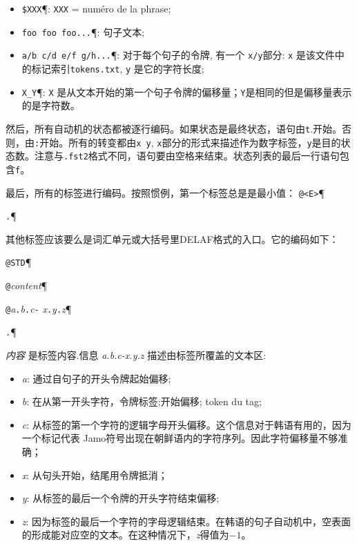 \begin{itemize}
\item \verb+$XXX+\P : \verb+XXX+ = numéro de la phrase;

\item \verb+foo foo foo...+\P : 句子文本;

\item \verb+a/b c/d e/f g/h...+\P : 对于每个句子的令牌, 有一个 \verb+x/y+部分: \verb+x+ 是该文件中的标记索引\verb+tokens.txt+, \verb+y+ 是它的字符长度;

\item \verb+X_Y+\P : \verb+X+ 
是从文本开始的第一个句子令牌的偏移量；\verb+Y+是相同的但是偏移量表示的是字符数。\end{itemize}


\bigskip
\noindent
然后，所有自动机的状态都被逐行编码。如果状态是最终状态，语句由\verb+t+.开始。否则，由\verb+:+开始。所有的转变都由\verb+x y+, \verb+x+部分的形式来描述作为数字标签，\verb+y+是目的状态数。注意与\verb+.fst2+格式不同，语句要由空格来结束。状态列表的最后一行语句包含\verb+f+。


\bigskip
\noindent 最后，所有的标签进行编码。按照惯例，第一个标签总是是最小值：
\bigskip
\noindent \verb$@<E>$\P

\noindent \verb$.$\P


\bigskip
\noindent 
其他标签应该要么是词汇单元或大括号里DELAF格式的入口。它的编码如下：


\bigskip
\noindent \verb$@STD$\P

\noindent \verb$@$\textit{content}\P

\noindent \verb$@$\textit{a}\verb$.$\textit{b}\verb$.$\textit{c}\verb$-$
\textit{x}\verb$.$\textit{y}\verb$.$\textit{z}\P

\noindent \verb$.$\P


\bigskip
\noindent \textit{内容} 是标签内容.信息 \textit{a.b.c-x.y.z}
描述由标签所覆盖的文本区:

\begin{itemize}
\item \textit{a}: 通过自句子的开头令牌起始偏移;
\item \textit{b}: 在从第一开头字符，令牌标签;开始偏移;
	token du tag;
\item \textit{c}: 从标签的第一个字符的逻辑字母开头偏移。这个信息对于韩语有用的，因为一个标记代表 Jamo符号出现在朝鲜语内的字符序列。因此字符偏移量不够准确；

    \item \textit{x}:
    从句头开始，结尾用令牌抵消；

    \item \textit{y}: 从标签的最后一个令牌的开头字符结束偏移;
    \item \textit{z}: 因为标签的最后一个字符的字母逻辑结束。在韩语的句子自动机中，空表面的形成能对应空的文本。在这种情况下，\textit{z}得值为$-1$。

\end{itemize}

